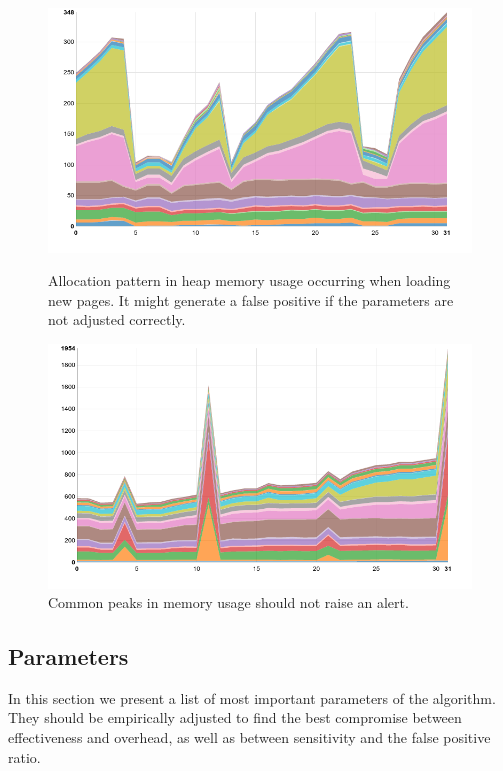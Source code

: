 \documentclass[preprint, numbers]{sigplanconf}
\begin{document}
\begin{figure}
\centering
\includegraphics[scale=0.3]{chart4}
	\caption{Allocation pattern in heap memory usage occurring when loading new pages.
	It might generate a false positive if the parameters are not adjusted correctly.}
\label{fig:chart4}
\vspace{1.08cm}

\includegraphics[scale=0.31]{chart3}
	\caption{Common peaks in memory usage should not raise an alert.}
\label{fig:chart3}
\end{figure}

\subsection{Parameters}
\label{sec:params}

In this section we present a list of most important parameters of the algorithm.
They should be empirically adjusted to find the best compromise between
effectiveness and overhead, as well as between sensitivity and the false positive ratio.
\end{document}
